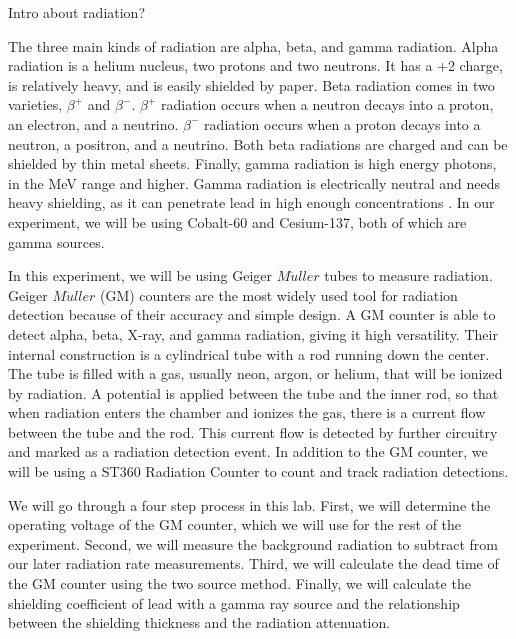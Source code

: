 \par Intro about radiation? 
\par The three main kinds of radiation are alpha, beta, and gamma radiation. Alpha radiation is a helium nucleus, two protons and two neutrons. It has a +2 charge, is relatively heavy, and is easily shielded by paper. Beta radiation comes in two varieties, $\beta^+$ and $\beta^-$. $\beta^+$ radiation occurs when a neutron decays into a proton, an electron, and a neutrino. $\beta^-$ radiation occurs when a proton decays into a neutron, a positron, and a neutrino. Both beta radiations are charged and can be shielded by thin metal sheets. Finally, gamma radiation is high energy photons, in the MeV range and higher. Gamma radiation is electrically neutral and needs heavy shielding, as it can penetrate lead in high enough concentrations \cite{Radiation Source}. In our experiment, we will be using Cobalt-60 and Cesium-137, both of which are gamma sources.
\par In this experiment, we will be using Geiger $M\ddot{u}ller$ tubes to measure radiation. Geiger $M\ddot{u}ller$ (GM) counters are the most widely used tool for radiation detection because of their accuracy and simple design. A GM counter is able to detect alpha, beta, X-ray, and gamma radiation, giving it high versatility. Their internal construction is a cylindrical tube with a rod running down the center. The tube is filled with a gas, usually neon, argon, or helium, that will be ionized by radiation. A potential is applied between the tube and the inner rod, so that when radiation enters the chamber and ionizes the gas, there is a current flow between the tube and the rod. This current flow is detected by further circuitry and marked as a radiation detection event.\cite{Centric} In addition to the GM counter, we will be using a ST360 Radiation Counter to count and track radiation detections. 
\par We will go through a four step process in this lab. First, we will determine the operating voltage of the GM counter, which we will use for the rest of the experiment. Second, we will measure the background radiation to subtract from our later radiation rate measurements. Third, we will calculate the dead time of the GM counter using the two source method. Finally, we will calculate the shielding coefficient of lead with a gamma ray source and the relationship between the shielding thickness and the radiation attenuation.
